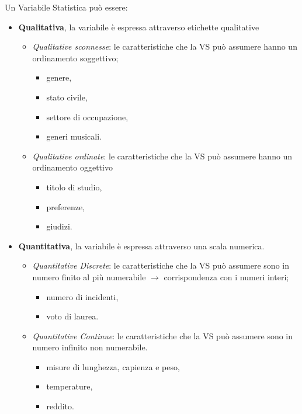 \documentclass[
  11pt,
]{book}
\providecommand{\tightlist}{%
  \setlength{\itemsep}{0pt}\setlength{\parskip}{0pt}}
\theoremstyle{mytheoremstyle}
\theoremstyle{mydefstyle}
\begin{document}
Un Variabile Statistica può essere:

\begin{itemize}
\tightlist
\item
  \textbf{Qualitativa}, la variabile è espressa attraverso etichette qualitative

  \begin{itemize}
  \tightlist
  \item
    \emph{Qualitative sconnesse}: le caratteristiche che la VS può assumere hanno un ordinamento soggettivo;

    \begin{itemize}
    \tightlist
    \item
      genere,
    \item
      stato civile,
    \item
      settore di occupazione,
    \item
      generi musicali.
    \end{itemize}
  \item
    \emph{Qualitative ordinate}: le caratteristiche che la VS può assumere hanno un ordinamento oggettivo

    \begin{itemize}
    \tightlist
    \item
      titolo di studio,
    \item
      preferenze,
    \item
      giudizi.
    \end{itemize}
  \end{itemize}
\item
  \textbf{Quantitativa}, la variabile è espressa attraverso una scala numerica.

  \begin{itemize}
  \tightlist
  \item
    \emph{Quantitative Discrete}: le caratteristiche che la VS può assumere sono in numero finito al più numerabile \(\rightarrow\) corrispondenza con i numeri interi;

    \begin{itemize}
    \tightlist
    \item
      numero di incidenti,
    \item
      voto di laurea.
    \end{itemize}
  \item
    \emph{Quantitative Continue}: le caratteristiche che la VS può assumere sono in numero infinito non numerabile.

    \begin{itemize}
    \tightlist
    \item
      misure di lunghezza, capienza e peso,
    \item
      temperature,
    \item
      reddito.
    \end{itemize}
  \end{itemize}
\end{itemize}
\end{document}
